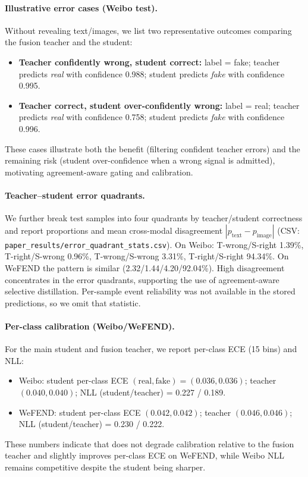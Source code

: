 \paragraph{Illustrative error cases (Weibo test).} Without revealing text/images, we list two representative outcomes comparing the fusion teacher and the \modelname{} student:
\begin{itemize}
  \item \textbf{Teacher confidently wrong, student correct:} label = fake; teacher predicts \emph{real} with confidence 0.988; student predicts \emph{fake} with confidence 0.995.
  \item \textbf{Teacher correct, student over-confidently wrong:} label = real; teacher predicts \emph{real} with confidence 0.758; student predicts \emph{fake} with confidence 0.996.
\end{itemize}
These cases illustrate both the benefit (filtering confident teacher errors) and the remaining risk (student over-confidence when a wrong signal is admitted), motivating agreement-aware gating and calibration.

\paragraph{Teacher--student error quadrants.} We further break test samples into four quadrants by teacher/student correctness and report proportions and mean cross-modal disagreement $|p_\text{text}-p_\text{image}|$ (CSV: \texttt{paper\_results/error\_quadrant\_stats.csv}). On Weibo: T-wrong/S-right 1.39\%, T-right/S-wrong 0.96\%, T-wrong/S-wrong 3.31\%, T-right/S-right 94.34\%. On WeFEND the pattern is similar (2.32/1.44/4.20/92.04\%). High disagreement concentrates in the error quadrants, supporting the use of agreement-aware selective distillation. Per-sample event reliability was not available in the stored predictions, so we omit that statistic.

\paragraph{Per-class calibration (Weibo/WeFEND).} For the main student and fusion teacher, we report per-class ECE (15 bins) and NLL:
\begin{itemize}
  \item Weibo: student per-class ECE $(\text{real},\text{fake}) = (0.036, 0.036)$; teacher $(0.040, 0.040)$; NLL (student/teacher) = 0.227 / 0.189.
  \item WeFEND: student per-class ECE $(0.042, 0.042)$; teacher $(0.046, 0.046)$; NLL (student/teacher) = 0.230 / 0.222.
\end{itemize}
These numbers indicate that \modelname{} does not degrade calibration relative to the fusion teacher and slightly improves per-class ECE on WeFEND, while Weibo NLL remains competitive despite the student being sharper.

